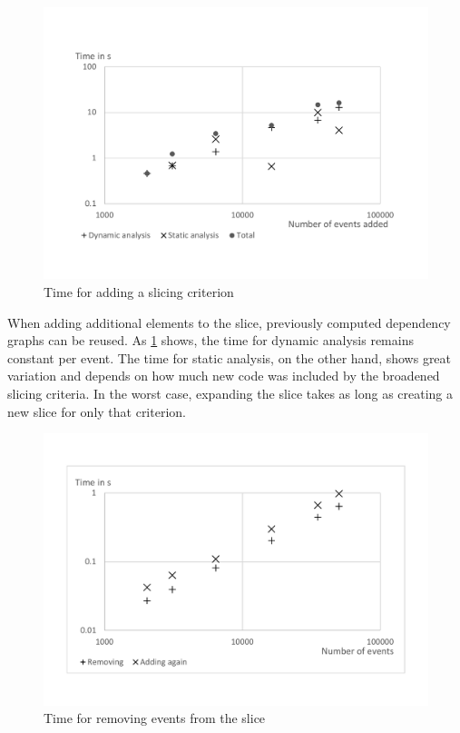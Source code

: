 \documentclass[
			english,
			review,
			]{elsarticle}
\begin{document}
\begin{figure}
	\centering
		\includegraphics[width=\linewidth, clip, trim={20mm 26mm 20mm 26mm}]{chart-add.pdf}
	\caption{Time for adding a slicing criterion}
	\label{fig:chartadd}
\end{figure}

When adding additional elements to the slice, previously computed dependency graphs can be reused.
As \cref{fig:chartadd} shows, the time for dynamic analysis remains constant per event.
The time for static analysis, on the other hand, shows great variation and depends on how much new code was included by the broadened slicing criteria.
In the worst case, expanding the slice takes as long as creating a new slice for only that criterion.

\begin{figure}
	\centering
		\includegraphics[width=\linewidth, clip, trim={20mm 26mm 20mm 26mm}]{chart-rem.pdf}
	\caption{Time for removing events from the slice}
	\label{fig:chartrem}
\end{figure}
\end{document}
